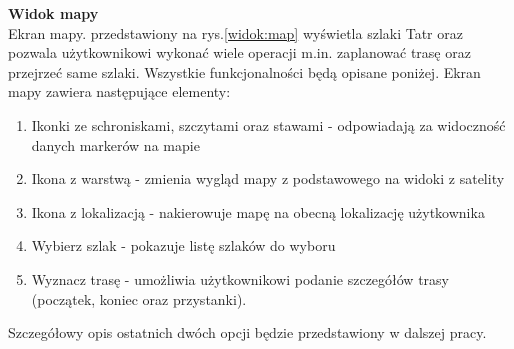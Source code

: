 \textbf{Widok mapy} \\
\indent Ekran mapy. przedstawiony na rys.\ref{widok:map} wyświetla szlaki Tatr oraz pozwala użytkownikowi wykonać wiele operacji m.in. zaplanować trasę oraz przejrzeć same szlaki. Wszystkie funkcjonalności będą opisane poniżej.
Ekran mapy zawiera następujące elementy:
\begin{enumerate}
    \item Ikonki ze schroniskami, szczytami oraz stawami - odpowiadają za widoczność  danych markerów na mapie
    \item Ikona z warstwą - zmienia wygląd mapy z podstawowego na widoki z satelity
    \item Ikona z lokalizacją - nakierowuje mapę na obecną lokalizację użytkownika
    \item Wybierz szlak - pokazuje listę szlaków do wyboru
    \item Wyznacz trasę - umożliwia użytkownikowi podanie szczegółów trasy (początek, koniec oraz przystanki).
\end{enumerate}
Szczegółowy opis ostatnich dwóch opcji będzie przedstawiony w dalszej pracy.


